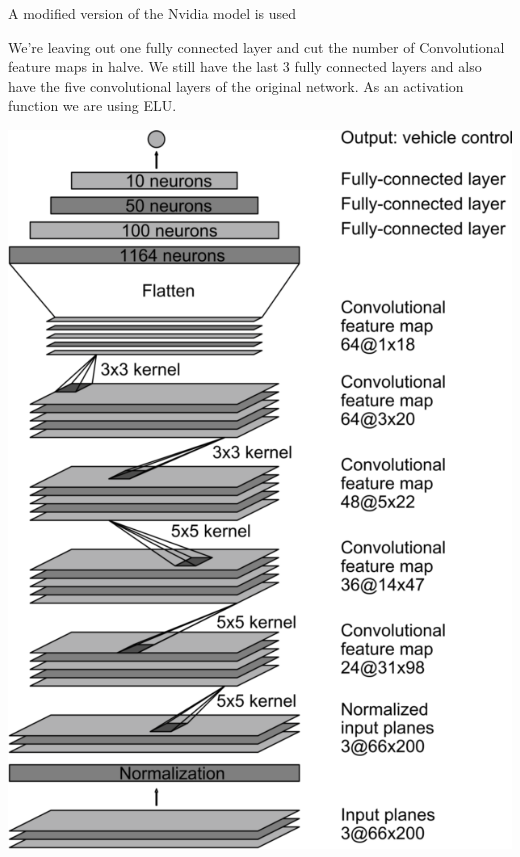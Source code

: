\begin{multicols*}{2}
A modified version of the Nvidia model is used

We're leaving out one fully connected layer and cut the number of Convolutional
feature maps in halve. We still have the last 3 fully connected layers and
 also have the five convolutional layers of the original network. As an activation function we are using ELU.
\begin{minipage}{0.25\textwidth}
 \centering
  \includegraphics[width=0.1\linewidth]{images/nvidia_architecture.png}
\end{minipage}
\end{multicols*}